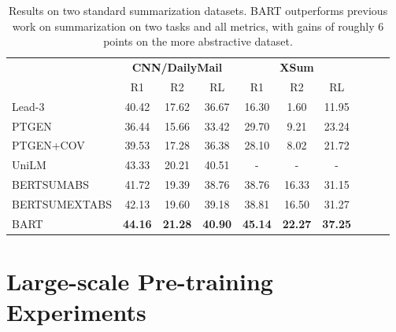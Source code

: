 \documentclass{article} %
\begin{document}
\begin{table}[t]
\centering
\begin{tabular}{lccccccccc}
\toprule
                          & \multicolumn{3}{c}{\textbf{CNN/DailyMail}} &  \multicolumn{3}{c}{\textbf{XSum}} \\
                          & R1        & R2        & RL           & R1     & R2     & RL     \\
\midrule
Lead-3                    & 40.42     & 17.62     & 36.67            & 16.30  & 1.60   & 11.95 \\
PTGEN \cite{see:2017}     & 36.44     & 15.66     & 33.42            & 29.70  & 9.21   & 23.24  \\
PTGEN+COV \cite{see:2017} & 39.53     & 17.28     & 36.38            & 28.10  & 8.02   & 21.72  \\
UniLM                     &  43.33    &  20.21    & 40.51            &   -    &    -   &    -   \\
BERTSUMABS \citep{bertsum}               & 41.72     & 19.39     & 38.76            &    38.76 & 16.33 & 31.15  \\
BERTSUMEXTABS  \citep{bertsum}            & 42.13     & 19.60     & 39.18            & 38.81  & 16.50  & 31.27   \\
\midrule
BART                      & \textbf{44.16}      & \textbf{21.28}      & \textbf{40.90}         & \textbf{45.14}   & \textbf{22.27}   & \textbf{37.25} \\
\bottomrule
\end{tabular}
\caption{Results on two standard summarization datasets. BART outperforms previous work on summarization on two tasks and all metrics, with gains of roughly 6 points on the more abstractive dataset.}
\end{table}









\section{Large-scale Pre-training Experiments}
\label{sec:large-scale}
\end{document}

